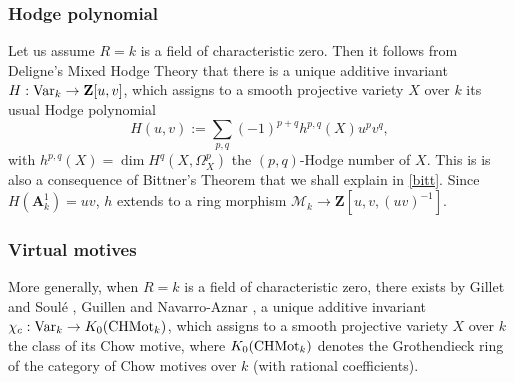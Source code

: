 \documentclass[english,12pt]{amsart}
\def\AA{{\mathbf A}}
\def\ZZ{{\mathbf Z}}
\def\cM{{\mathcal M}}
\theoremstyle{definition}
\theoremstyle{remark}
\theoremstyle{plain}
\numberwithin{equation}{subsection}
\def\AA{{\mathbf A}}
\def\ZZ{{\mathbf Z}}
\def\cM{{\mathcal M}}
\begin{document}
\subsubsection{Hodge polynomial}\label{hdp}Let us assume 
$R = k$ is a field of characteristic zero.
Then it follows from Deligne's Mixed Hodge Theory that
there is a unique 
additive invariant
$H : {\rm Var}_k \rightarrow \ZZ [u, v]$,
which assigns to a smooth projective variety $X$ over $k$
its usual Hodge polynomial
$$
H (u, v) := \sum_{p, q} (-1)^{p + q} h^{p,q} (X) u^p v^q ,
$$
with $h^{p,q} (X) = \dim H^q (X, \Omega^p_X)$ the $(p,q)$-Hodge number of $X$.
This is is also a consequence of Bittner's Theorem that we shall
explain in \ref{bitt}.
Since $H (\AA^1_k) = uv$,
$h$ extends to a ring morphism
$\cM_k \rightarrow \ZZ [u, v, (uv)^{-1}]$.


\subsubsection{Virtual motives}\label{vm}More generally, 
when $R = k$ is a field of characteristic zero, there exists by Gillet and Soul\'e \cite{GS},
Guillen and Navarro-Aznar \cite{GN},
a unique additive invariant $\chi_c : {\rm Var}_k \rightarrow K_0 ({\rm CHMot}_k)$,
which 
assigns to a smooth projective variety $X$ over $k$
the class of its Chow motive, where $ K_0 ({\rm CHMot}_k)$
denotes the Grothendieck ring of the category of Chow
motives over $k$ (with rational coefficients).
\end{document}

